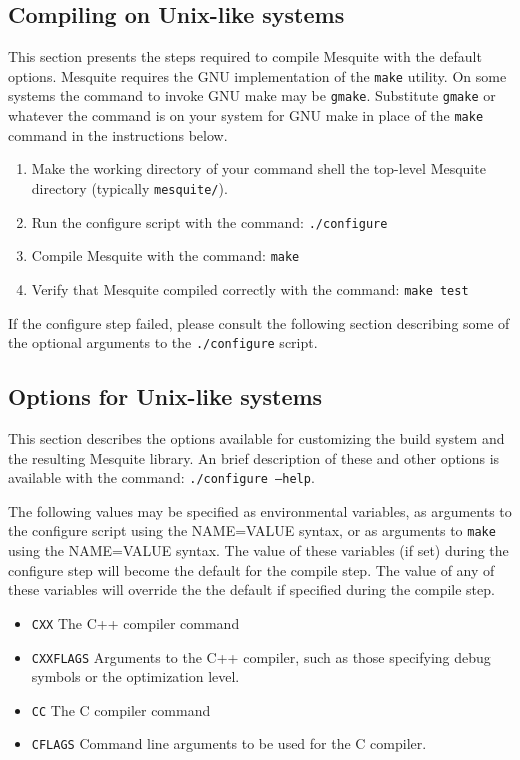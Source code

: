 \subsection{Compiling on Unix-like systems}
This section presents the steps required to compile Mesquite with the default
options.  Mesquite requires the GNU implementation of the \texttt{make} utility.
On some systems the command to invoke GNU make may be \texttt{gmake}.  Substitute
\texttt{gmake} or whatever the command is on your system for GNU make in place of
the \texttt{make} command in the instructions below.
\begin{enumerate}
\item Make the working directory of your command shell the top-level Mesquite
directory (typically \texttt{mesquite/}).
\item Run the configure script with the command: \texttt{./configure}
\item Compile Mesquite with the command: \texttt{make} 
\item Verify that Mesquite compiled correctly with the command: \texttt{make test}
\end{enumerate}
If the configure step failed, please consult the following section describing 
some of the optional arguments to the \texttt{./configure} script. 
\subsection{Options for Unix-like systems}
This section describes the options available for customizing the build
system and the resulting Mesquite library.  An brief description of these
and other options is available with the command: \texttt{./configure --help}.

\label{mes_vars_and_defs}
The following values may be specified as environmental variables, as arguments
to the configure script using the NAME=VALUE syntax, or as arguments to \texttt{make}
using the NAME=VALUE syntax.  The value of these variables (if set) during the
configure step will become the default for the compile step.  The value of any
of these variables will override the the default if specified during the compile
step.
\begin{itemize}
\item \texttt{CXX}       The C++ compiler command
\item \texttt{CXXFLAGS}  Arguments to the C++ compiler, such as those specifying 
debug symbols or the optimization level.
\item \texttt{CC}        The C compiler command
\item \texttt{CFLAGS}    Command line arguments to be used for the C compiler.
\end{itemize}

